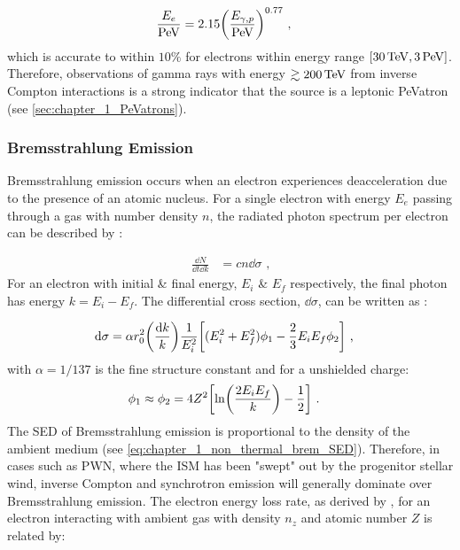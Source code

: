 \begin{equation}
    \begin{aligned}
    \frac{E_e}{\PeV}&=2.15 \qty(\frac{E_{\gamma,p}}{\PeV})^{0.77}\text{ ,}
    \end{aligned}
\end{equation}
which is accurate to within $10\%$ for electrons within energy range $[30\,\TeV,3\,\PeV]$. Therefore, observations of gamma rays with energy $\gtrsim 200\,\TeV$ from inverse Compton interactions is a strong indicator that the source is a leptonic PeVatron (see \autoref{sec:chapter_1_PeVatrons}).

\subsubsection{Bremsstrahlung Emission}

Bremsstrahlung emission occurs when an electron experiences deacceleration due to the presence of an atomic nucleus. For a single electron with energy $E_e$ passing through a gas with number density $n$, the radiated photon spectrum per electron can be described by \citep{RevModPhys.42.237}:

\begin{equation}
	\begin{split}
		\frac{\dd{N}}{\dd{t}\dd{k}}&=cn\dd{\sigma} \text{ ,}
	\end{split} \label{eq:chapter_1_non_thermal_brem_SED}
\end{equation}
\noindent For an electron with initial \& final energy, $E_i$ \& $E_f$ respectively, the final photon has energy $k=E_i-E_f$. The differential cross section, $\dd{\sigma}$, can be written as \citep{1934RSPSA.146...83B}:

\begin{equation}
	\begin{split}
		\dd{\sigma}&=\alpha r_0^2\qty(\frac{\dd{k}}{k})\frac{1}{E_i^2}\qty[(E_i^2+E_f^2)\phi_1-\frac{2}{3}E_i E_f\phi_2]\text{ ,} \label{eq:chapter_1_non_thermal_brem_cross_section} 
	\end{split}
\end{equation}
\noindent with $\alpha=1/137$ is the fine structure constant and for a unshielded charge:
\begin{equation}
    \begin{aligned}
        \phi_1&\approx\phi_2=4Z^2\qty[\ln(\frac{2E_iE_f}{k})-\frac{1}{2}]\text{ .}
    \end{aligned}
\end{equation}
\newpar
The SED of Bremsstrahlung emission is proportional to the density of the ambient medium (see \autoref{eq:chapter_1_non_thermal_brem_SED}). Therefore, in cases such as PWN, where the ISM has been "swept" out by the progenitor stellar wind, inverse Compton and synchrotron emission will generally dominate over Bremsstrahlung emission. The electron energy loss rate, as derived by \cite{RevModPhys.42.237}, for an electron interacting with ambient gas with density $n_z$ and atomic number $Z$ is related by:

